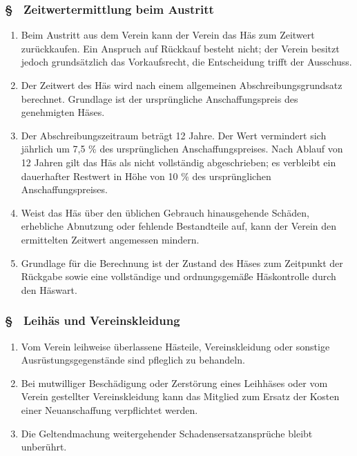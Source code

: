 \subsubsection{§ \thehoparagraphcounter\ Zeitwertermittlung beim Austritt} \label{ho:par:zeitwertermittlung_austritt}
\begin{enumerate}
    \item \label{ho:abs:gr8q3z} Beim Austritt aus dem Verein kann der Verein das Häs zum Zeitwert zurückkaufen. Ein Anspruch auf Rückkauf besteht nicht; der Verein besitzt jedoch grundsätzlich das Vorkaufsrecht, die Entscheidung trifft der Ausschuss.

    \item \label{ho:abs:dsqhzq} Der Zeitwert des Häs wird nach einem allgemeinen Abschreibungsgrundsatz berechnet. Grundlage ist der ursprüngliche Anschaffungspreis des genehmigten Häses.

    \item \label{ho:abs:xxzxq0} Der Abschreibungszeitraum beträgt 12 Jahre. Der Wert vermindert sich jährlich um 7,5 \% des ursprünglichen Anschaffungspreises. Nach Ablauf von 12 Jahren gilt das Häs als nicht vollständig abgeschrieben; es verbleibt ein dauerhafter Restwert in Höhe von 10 \% des ursprünglichen Anschaffungspreises.

    \item \label{ho:abs:8tgvwy} Weist das Häs über den üblichen Gebrauch hinausgehende Schäden, erhebliche Abnutzung oder fehlende Bestandteile auf, kann der Verein den ermittelten Zeitwert angemessen mindern.

    \item \label{ho:abs:ouncd6} Grundlage für die Berechnung ist der Zustand des Häses zum Zeitpunkt der Rückgabe sowie eine vollständige und ordnungsgemäße Häskontrolle durch den Häswart.
\end{enumerate}

\subsubsection{§ \thehoparagraphcounter\ Leihäs und Vereinskleidung} \label{ho:par:leihaes_vereinskleidung}
\begin{enumerate}
    \item \label{ho:abs:76ne8y} Vom Verein leihweise überlassene Hästeile, Vereinskleidung oder sonstige Ausrüstungsgegenstände sind pfleglich zu behandeln.
    
    \item \label{ho:abs:l5h91r} Bei mutwilliger Beschädigung oder Zerstörung eines Leihhäses oder vom Verein gestellter Vereinskleidung kann das Mitglied zum Ersatz der Kosten einer Neuanschaffung verpflichtet werden.
    
    \item \label{ho:abs:o6u8lp} Die Geltendmachung weitergehender Schadensersatzansprüche bleibt unberührt.
\end{enumerate}

